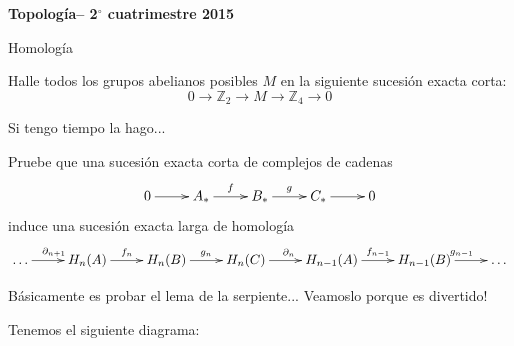 \documentclass[11pt,a4paper,oneside]{article}
\newcommand{\Z}{\mathbb{Z}}
\newenvironment{proof}[1][Demostraci\'on]{\begin{trivlist}
\item[\hskip \labelsep {\bfseries #1}]}{\end{trivlist}}
\begin{document}
\pagestyle{empty}
\pagestyle{fancy}
\fancyfoot[CO]{\slshape \thepage}
\renewcommand{\headrulewidth}{0pt}


\centerline{\bf Topolog\'ia-- 2$^\circ$
cuatrimestre 2015}
\centerline{\sc Homolog\'ia}

\bigskip

\sffamily

\begin{enumerate}

%

\item
Halle todos los grupos abelianos posibles $M$ en la siguiente
sucesi\'on exacta corta:
$$0\to \Z_2\to M \to \Z_4\to 0$$

\begin{proof}
Si tengo tiempo la hago...
\end{proof}

\item
Pruebe que una sucesi\'on exacta corta de complejos de cadenas
\[\xymatrix{0 \ar[r] & A_* \ar[r]^f& B_*  \ar[r]^g & C_*  \ar[r] &  0}\]
induce una sucesi\'on exacta larga de homolog\'ia
\[\xymatrix{\dots\ar[r]^{ \partial_{n+1}}& H_n(A)\ar[r]^{f_n}& H_n(B)\ar[r]^{g_n}& H_n(C) \ar[r]^{\partial_{n}}& H_{n-1}(A)\ar[r]^{f_{n-1}}&H_{n-1}(B)\ar[r]^{g_{n-1}}&\dots}\]

\begin{proof}

B\'asicamente es probar el lema de la serpiente... Veamoslo porque es divertido!

Tenemos el siguiente diagrama:


\end{proof}
\end{enumerate}
\end{document}
